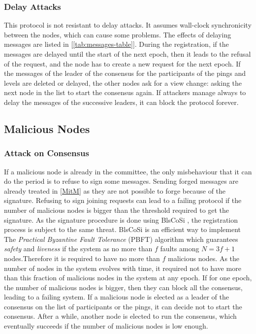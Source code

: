 \documentclass[a4paper,11pt,oneside]{report}
\begin{document}
\subsubsection{Delay Attacks}
This protocol is not resistant to delay attacks. It assumes wall-clock synchronicity between the nodes, which can cause some problems. The effects of
delaying messages are listed in [\autoref{tab:messages-table}]. During the
registration, if the messages are delayed until the start of the next epoch,
then it leads to the refusal of the request, and the node has to create a
new request for the next epoch. If the messages of the leader of the consensus
for the participants of the pings and levels are deleted or delayed, the other
nodes ask for a view change: asking the next node in the list to start the
consensus again. If attackers manage always to delay the messages of the
successive leaders, it can block the protocol forever.

\subsection{Malicious Nodes}
\subsubsection{Attack on Consensus} If a malicious
node is already in the committee, the only misbehaviour that it
can do the period is to refuse to sign some messages. Sending forged messages
are already treated in \autoref{MitM} as they are not possible to forge because
of the signature. Refusing to sign joining requests can lead to a failing protocol
if the number of malicious nodes is bigger than the threshold required to get
the signature. As the signature procedure is done using BlsCoSi \cite{Boneh2018},
the registration process is subject to the same threat. BlsCoSi
\cite{Boneh2018} is an efficient way to implement The \textit{Practical
Byzantine Fault Tolerance} (PBFT) \cite{Castro1999} algorithm which guarantees
\textit{safety} and \textit{liveness} if the system as no more than $f$ faults
among $N = 3f+1$ nodes.Therefore it is required to have no more than $f$
malicious nodes. As the number of nodes in the system evolves
with time, it required not to have more than this fraction of malicious nodes
in the system at any epoch. If for one epoch, the number of malicious nodes is
bigger, then they can block all the consensus, leading to a failing system. 
If a malicious node is elected as a leader of the consensus on the list of
participants or the pings, it can decide not to start the consensus. After a
while, another node is elected to run the consensus, which eventually
succeeds if the number of malicious nodes is low enough.
\end{document}
